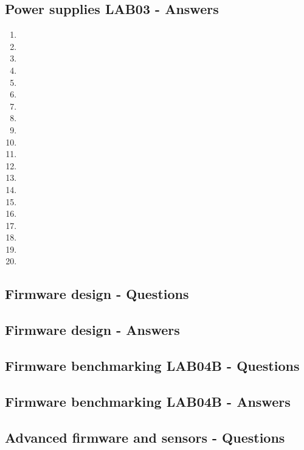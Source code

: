 \documentclass[../main.tex]{subfiles}
\begin{document}
\subsection{Power supplies LAB03 - Answers}

\begin{enumerate}[label=\textbf{\arabic*.}]
	\item
	\item
	\item
	\item
	\item
	\item
	\item
	\item
	\item
	\item
	\item
	\item
	\item
	\item
	\item
	\item
	\item
	\item
	\item
	\item
\end{enumerate}


\vspace*{1.5cm}
\subsection{Firmware design - Questions}
\subsection{Firmware design - Answers}

\vspace*{1.5cm}
\subsection{Firmware benchmarking LAB04B - Questions}
\subsection{Firmware benchmarking LAB04B - Answers}

\vspace*{1.5cm}
\subsection{Advanced firmware and sensors - Questions}
\end{document}

